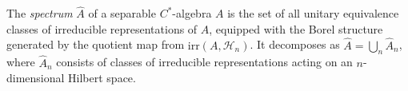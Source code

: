The \emph{spectrum} $\hat{A}$ of a separable $C^*$-algebra $A$ is the set of all unitary equivalence classes of irreducible representations of $A$, equipped with the Borel structure generated by the quotient map from $\text{irr}(A, \mathcal{H}_n)$. It decomposes as $\hat{A} = \bigcup_{n} \hat{A}_n$, where $\hat{A}_n$ consists of classes of irreducible representations acting on an $n$-dimensional Hilbert space.

